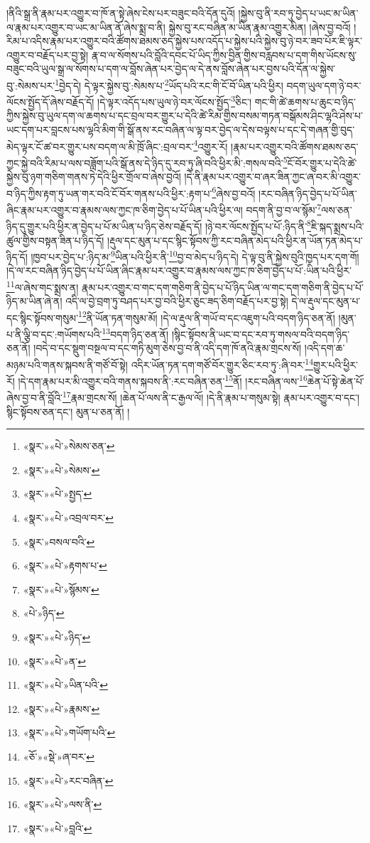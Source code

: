 །ནིའི་སྒྲ་ནི་རྣམ་པར་འགྱུར་བ་ཁོ་ན་སྟེ་ཞེས་ངེས་པར་བཟུང་བའི་དོན་དུའོ། །སྐྱེས་བུ་ནི་རབ་ཏུ་བྱེད་པ་ཡང་མ་ཡིན་ལ་རྣམ་པར་འགྱུར་བ་ཡང་མ་ཡིན་ནོ་ཞེས་སྨྲ་བ་ནི། སྐྱེས་བུ་རང་བཞིན་མ་ཡིན་རྣམ་འགྱུར་མིན། །ཞེས་བྱ་བའོ། །རིམ་པ་འདིས་རྣམ་པར་འགྱུར་བའི་ཚོགས་ཐམས་ཅད་སྐྱེས་པས་འདོད་པ་སྐྱེས་པའི་སྐྱེས་བུ་ཉེ་བར་ཟབ་པོར་ཇི་ལྟར་འགྱུར་བ་བརྗོད་པར་བྱ་སྟེ། རྣ་བ་ལ་སོགས་པའི་བློའི་དབང་པོ་ཡིད་ཀྱིས་བྱིན་གྱིས་བརླབས་པ་དག་གིས་ཡོངས་སུ་བཟུང་བའི་ཡུལ་སྒྲ་ལ་སོགས་པ་དག་ལ་བློས་ཞེན་པར་བྱེད་ལ་དེ་ནས་བློས་ཞེན་པར་བྱས་པའི་དོན་ལ་སྐྱེས་བུ་:སེམས་པར་\footnote{«སྣར་»«པེ་»སེམས་ཅན་}བྱེད་དེ། དེ་ལྟར་སྐྱེས་བུ་:སེམས་པ་\footnote{«སྣར་»«པེ་»སེམས་}ཡོད་པའི་རང་གི་ངོ་བོ་ཡིན་པའི་ཕྱིར། བདག་ཡུལ་དག་ཉེ་བར་ལོངས་སྤྱོད་དོ་ཞེས་བརྗོད་དོ། །དེ་ལྟར་འདོད་པས་ཡུལ་ཉེ་བར་ལོངས་སྤྱོད་\footnote{«སྣར་»«པེ་»སྤྱད་}ཅིང་། གང་གི་ཚེ་ཆགས་པ་ཆུང་བ་ཉིད་ཀྱིས་སྐྱེས་བུ་ཡུལ་དག་ལ་ཆགས་པ་དང་བྲལ་བར་གྱུར་པ་དེའི་ཚེ་རིམ་གྱིས་བསམ་གཏན་བསྒོམས་ཤིང་ལྷའི་ཤེས་པ་ཡང་དག་པར་བླངས་པས་ལྷའི་མིག་གི་སྒོ་ནས་རང་བཞིན་ལ་ལྟ་བར་བྱེད་ལ་དེས་བལྟས་པ་དང་དེ་གཞན་གྱི་བུད་མེད་ལྟར་ངོ་ཚ་བར་གྱུར་པས་བདག་ལ་མི་ཁྲོ་ཞིང་:བྲལ་བར་\footnote{«སྣར་»«པེ་»འབྲལ་བར་}འགྱུར་རོ། །རྣམ་པར་འགྱུར་བའི་ཚོགས་ཐམས་ཅད་ཀྱང་སྐྱེ་བའི་རིམ་པ་ལས་བཟློག་པའི་སྒོ་ནས་དེ་ཉིད་དུ་རབ་ཏུ་ཞི་བའི་ཕྱིར་མི་:གསལ་བའི་\footnote{«སྣར་»བསལ་བའི་}ངོ་བོར་གྱུར་པ་དེའི་ཚེ་སྐྱེས་བུ་ཉག་གཅིག་གནས་ཏེ་དེའི་ཕྱིར་གྲོལ་བ་ཞེས་བྱའོ། །དེ་ནི་རྣམ་པར་འགྱུར་བ་ཞར་ཟིན་ཀྱང་ཞ་བར་མི་འགྱུར་བ་ཉིད་ཀྱིས་རྟག་ཏུ་ཡན་གར་བའི་ངོ་བོར་གནས་པའི་ཕྱིར་:རྟག་པ་\footnote{«སྣར་»«པེ་»རྟགས་པ་}ཞེས་བྱ་བའོ། །རང་བཞིན་ཉིད་བྱེད་པ་པོ་ཡིན་ཞིང་རྣམ་པར་འགྱུར་བ་རྣམས་ལས་ཀྱང་ཁ་ཅིག་བྱེད་པ་པོ་ཡིན་པའི་ཕྱིར་ལ། བདག་ནི་བྱ་བ་ལ་སྙོམ་\footnote{«སྣར་»«པེ་»སྙོམས་}ལས་ཅན་ཉིད་དུ་གྱུར་པའི་ཕྱིར་ན་བྱེད་པ་པོ་མ་ཡིན་པ་ཉིད་ཅེས་བརྗོད་དོ། །ཉེ་བར་ལོངས་སྤྱོད་པ་པོ་:ཉིད་ནི་\footnote{«པེ་»ཉིད་}ཇི་སྐད་སྨྲས་པའི་ཚུལ་གྱིས་བསྟན་ཟིན་པ་ཉིད་དོ། །རྡུལ་དང་མུན་པ་དང་སྙིང་སྟོབས་ཀྱི་རང་བཞིན་མེད་པའི་ཕྱིར་ན་ཡོན་ཏན་མེད་པ་ཉིད་དོ། །ཁྱབ་པར་བྱེད་པ་:ཉིད་མ་\footnote{«སྣར་»«པེ་»ཉིད་}ཡིན་པའི་ཕྱིར་ནི་\footnote{«སྣར་»«པེ་»ན་}བྱ་བ་མེད་པ་ཉིད་དེ། དེ་ལྟ་བུ་ནི་སྐྱེས་བུའི་ཁྱད་པར་དག་གོ། །དེ་ལ་རང་བཞིན་ཉིད་བྱེད་པ་པོ་ཡིན་ཞིང་རྣམ་པར་འགྱུར་བ་རྣམས་ལས་ཀྱང་ཁ་ཅིག་བྱེད་པ་པོ་:ཡིན་པའི་ཕྱིར་\footnote{«སྣར་»«པེ་»ཡིན་པའི་}ལ་ཞེས་གང་སྨྲས་ན། རྣམ་པར་འགྱུར་བ་གང་དག་གཅིག་ནི་བྱེད་པ་པོ་ཉིད་ཡིན་ལ་གང་དག་གཅིག་ནི་བྱེད་པ་པོ་ཉིད་མ་ཡིན་ཞེ་ན། འདི་ལ་བྱེ་བྲག་ཏུ་བཤད་པར་བྱ་བའི་ཕྱིར་ཅུང་ཟད་ཅིག་བརྗོད་པར་བྱ་སྟེ། དེ་ལ་རྡུལ་དང་མུན་པ་དང་སྙིང་སྟོབས་གསུམ་\footnote{«སྣར་»«པེ་»རྣམས་}ནི་ཡོན་ཏན་གསུམ་མོ། །དེ་ལ་རྡུལ་ནི་གཡོ་བ་དང་འཇུག་པའི་བདག་ཉིད་ཅན་ནོ། །མུན་པ་ནི་ལྕི་བ་དང་:གཡོགས་པའི་\footnote{«སྣར་»«པེ་»གཡོག་པའི་}བདག་ཉིད་ཅན་ནོ། །སྙིང་སྟོབས་ནི་ཡང་བ་དང་རབ་ཏུ་གསལ་བའི་བདག་ཉིད་ཅན་ནོ། །བདེ་བ་དང་སྡུག་བསྔལ་བ་དང་གཏི་མུག་ཅེས་བྱ་བ་ནི་འདི་དག་ཁོ་ནའི་རྣམ་གྲངས་སོ། །འདི་དག་ཆ་མཉམ་པའི་གནས་སྐབས་ནི་གཙོ་བོ་སྟེ། འདིར་ཡོན་ཏན་དག་གཙོ་བོར་གྱུར་ཅིང་རབ་ཏུ་:ཞི་བར་\footnote{«ཅོ་»«སྡེ་»ཞ་བར་}གྱུར་པའི་ཕྱིར་རོ། །དེ་དག་རྣམ་པར་མི་འགྱུར་བའི་གནས་སྐབས་ནི་:རང་བཞིན་ཅན་\footnote{«སྣར་»«པེ་»རང་བཞིན་}ནོ། །རང་བཞིན་ལས་\footnote{«སྣར་»«པེ་»ལས་ནི་}ཆེན་པོ་སྟེ་ཆེན་པོ་ཞེས་བྱ་བ་ནི་བློའི་\footnote{«སྣར་»«པེ་»བླའི་}རྣམ་གྲངས་སོ། །ཆེན་པོ་ལས་ནི་ང་རྒྱལ་ལོ། །དེ་ནི་རྣམ་པ་གསུམ་སྟེ། རྣམ་པར་འགྱུར་བ་དང་། སྙིང་སྟོབས་ཅན་དང་། མུན་པ་ཅན་ནོ། །
